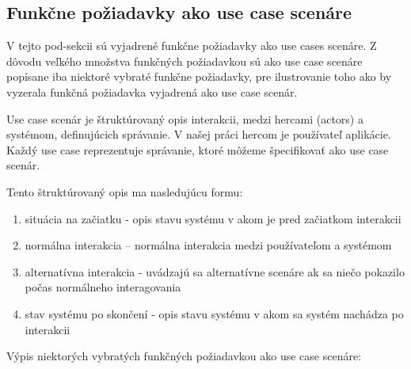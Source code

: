 \subsection{Funkčne požiadavky ako use case scenáre }
V tejto pod-sekcii sú vyjadrené funkčne požiadavky ako use cases scenáre.
Z dôvodu veľkého množstva funkčných požiadavkou sú ako use case scenáre popísane iba niektoré vybraté funkčne požiadavky,
pre ilustrovanie toho ako by vyzerala funkčná požiadavka vyjadrená ako use case scenár.

Use case scenár je štruktúrovaný opis interakcii, medzi hercami (actors) a systémom, definujúcich správanie. V našej práci hercom je používateľ aplikácie.
Každý use case reprezentuje správanie, ktoré môžeme špecifikovať ako use case scenár.

Tento štruktúrovaný opis ma nasledujúcu formu:
\begin{enumerate}
      \item situácia na začiatku - opis stavu systému v akom je pred začiatkom interakcii
      \item normálna interakcia – normálna interakcia medzi používateľom a systémom
      \item alternatívna interakcia - uvádzajú sa alternatívne scenáre ak sa niečo pokazilo počas normálneho interagovania
      \item stav systému po skončení - opis stavu systému v akom sa systém nachádza po interakcii
\end{enumerate}

Výpis niektorých vybratých funkčných požiadavkou ako use case scenáre:


